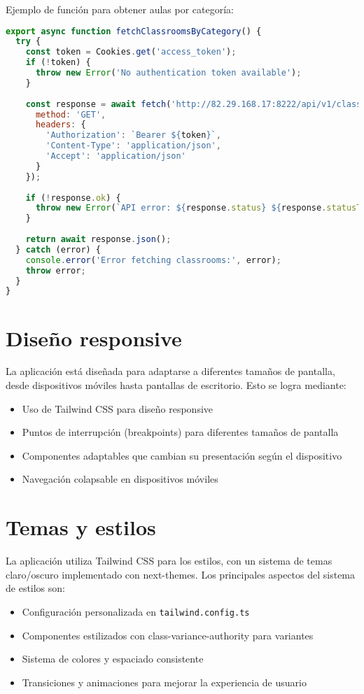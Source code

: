 \documentclass[12pt,a4paper]{report}
\begin{document}
Ejemplo de función para obtener aulas por categoría:

\begin{lstlisting}[language=JavaScript, caption=Función para obtener aulas por categoría]
export async function fetchClassroomsByCategory() {
  try {
    const token = Cookies.get('access_token');
    if (!token) {
      throw new Error('No authentication token available');
    }
    
    const response = await fetch('http://82.29.168.17:8222/api/v1/classrooms', {
      method: 'GET',
      headers: {
        'Authorization': `Bearer ${token}`,
        'Content-Type': 'application/json',
        'Accept': 'application/json'
      }
    });
    
    if (!response.ok) {
      throw new Error(`API error: ${response.status} ${response.statusText}`);
    }
    
    return await response.json();
  } catch (error) {
    console.error('Error fetching classrooms:', error);
    throw error;
  }
}
\end{lstlisting}

\section{Diseño responsive}
La aplicación está diseñada para adaptarse a diferentes tamaños de pantalla, desde dispositivos móviles hasta pantallas de escritorio. Esto se logra mediante:

\begin{itemize}
    \item Uso de Tailwind CSS para diseño responsive
    \item Puntos de interrupción (breakpoints) para diferentes tamaños de pantalla
    \item Componentes adaptables que cambian su presentación según el dispositivo
    \item Navegación colapsable en dispositivos móviles
\end{itemize}

\section{Temas y estilos}
La aplicación utiliza Tailwind CSS para los estilos, con un sistema de temas claro/oscuro implementado con next-themes. Los principales aspectos del sistema de estilos son:

\begin{itemize}
    \item Configuración personalizada en \texttt{tailwind.config.ts}
    \item Componentes estilizados con class-variance-authority para variantes
    \item Sistema de colores y espaciado consistente
    \item Transiciones y animaciones para mejorar la experiencia de usuario
\end{itemize}
\end{document}
